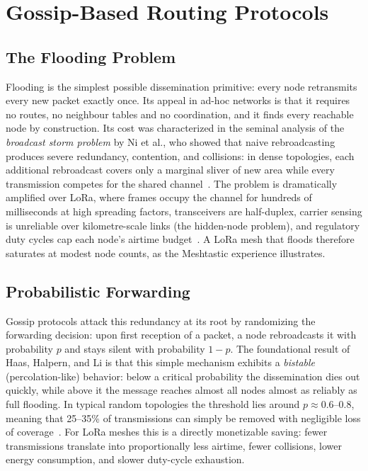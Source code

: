 \documentclass[english,bachelor]{tfgitic}[2026/01/22]
\begin{document}
\section{Gossip-Based Routing Protocols}
\label{sec:gossip}

\subsection{The Flooding Problem}

Flooding is the simplest possible dissemination primitive: every node retransmits every new packet exactly once. Its appeal in ad-hoc networks is that it requires no routes, no neighbour tables and no coordination, and it finds every reachable node by construction. Its cost was characterized in the seminal analysis of the \emph{broadcast storm problem} by Ni et al., who showed that naive rebroadcasting produces severe redundancy, contention, and collisions: in dense topologies, each additional rebroadcast covers only a marginal sliver of new area while every transmission competes for the shared channel~\cite{ni1999broadcast}. The problem is dramatically amplified over LoRa, where frames occupy the channel for hundreds of milliseconds at high spreading factors, transceivers are half-duplex, carrier sensing is unreliable over kilometre-scale links (the hidden-node problem), and regulatory duty cycles cap each node's airtime budget~\cite{adelantado2017limits,bor2016scale}. A LoRa mesh that floods therefore saturates at modest node counts, as the Meshtastic experience illustrates.

\subsection{Probabilistic Forwarding}

Gossip protocols attack this redundancy at its root by randomizing the forwarding decision: upon first reception of a packet, a node rebroadcasts it with probability $p$ and stays silent with probability $1-p$. The foundational result of Haas, Halpern, and Li is that this simple mechanism exhibits a \emph{bistable} (percolation-like) behavior: below a critical probability the dissemination dies out quickly, while above it the message reaches almost all nodes almost as reliably as full flooding. In typical random topologies the threshold lies around $p \approx 0.6$--$0.8$, meaning that 25--35\% of transmissions can simply be removed with negligible loss of coverage~\cite{haas2006gossip}. For LoRa meshes this is a directly monetizable saving: fewer transmissions translate into proportionally less airtime, fewer collisions, lower energy consumption, and slower duty-cycle exhaustion.
\end{document}
